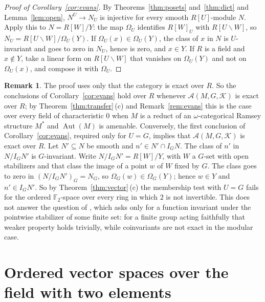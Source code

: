 \documentclass[11pt,a4paper]{article}
\theoremstyle{definition}
\newtheorem{remark}[theorem]{Remark}
\newcommand{\A}{\mathcal{A}}
\newcommand{\K}{\mathcal{K}}
\newcommand{\F}{\mathbb{F}}
\newcommand{\Aut}{\operatorname{Aut}}
\begin{document}
\begin{proof}[Proof of Corollary~\ref{cor:evans}]
By Theorems~\ref{thm:posets} and~\ref{thm:dict} and Lemma~\ref{lem:open},
$N^U\to N_U$ is injective for every smooth $R[U]$-module $N$. Apply this to
$N=R[W]/Y$: the map $\Omega_U$ identifies $R[W]_U$ with $R[U\backslash W]$,
so $N_U=R[U\backslash W]/\Omega_U(Y)$. If $\Omega_U(x)\in\Omega_U(Y)$, the
class of $x$ in $N$ is $U$-invariant and goes to zero in $N_U$, hence is
zero, and $x\in Y$. If $R$ is a field and $x\notin Y$, take a linear form on
$R[U\backslash W]$ that vanishes on $\Omega_U(Y)$ and not on $\Omega_U(x)$,
and compose it with $\Omega_U$.
\end{proof}

\begin{remark}\label{rem:reducts}
The proof uses only that the category is exact over $R$. So the conclusions
of Corollary~\ref{cor:evans} hold over $R$ whenever $\A(M,G,\K)$ is exact
over $R$; by Theorem~\ref{thm:transfer}\,(c) and Remark~\ref{rem:evans} this
is the case over every field of characteristic $0$ when $M$ is a reduct of
an $\omega$-categorical Ramsey structure $M^*$ and $\Aut(M)$ is amenable.
Conversely, the first conclusion of Corollary~\ref{cor:evans}, required
only for $U=G$, implies that $\A(M,G,\K)$ is exact over $R$. Let
$N'\subseteq N$ be smooth and $n'\in N'\cap I_GN$. The class of $n'$ in
$N/I_GN'$ is $G$-invariant. Write $N/I_GN'=R[W]/Y$, with $W$ a $G$-set with
open stabilizers and that class the image of a point $w$ of $W$ fixed by
$G$. The class goes to zero in $(N/I_GN')_G=N_G$, so
$\Omega_G(w)\in\Omega_G(Y)$; hence $w\in Y$ and $n'\in I_GN'$. So by
Theorem~\ref{thm:vector}\,(c) the membership test with $U=G$ fails for the
ordered $\F_2$-space over every ring in which $2$ is not invertible. This
does not answer the question of \cite[Remarks~2.12]{Ev}, which asks only for
a function invariant under the pointwise stabilizer of some finite set: for
a finite group acting faithfully that weaker property holds trivially, while
coinvariants are not exact in the modular case.
\end{remark}

\section{Ordered vector spaces over the field with two
elements}\label{sec:vector}
\end{document}
